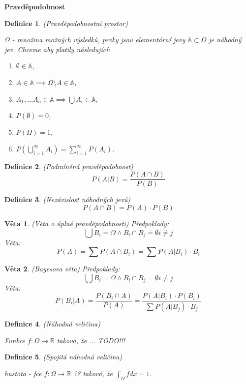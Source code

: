 \documentclass[a4paper,10pt,titlepage]{article} \usepackage[utf8]{inputenc}
\newtheorem{theorem}{Věta}
\newtheorem{define}{Definice}
\begin{document}
 \pagestyle{empty}
\begin{center}
\textbf{Pravděpodobnost}
\end{center}

\begin{define}
(Pravděpodobnostní prostor)

$\Omega$ - množina možných výsledků, prvky jsou elementární jevy
$\mathbb{A} \subset \Omega$ je náhodný jev.
Chceme aby platily následující:
\begin{enumerate}
\item $\emptyset \in \mathbb{A}$,
\item $A \in \mathbb{A} \implies \Omega \setminus A \in \mathbb{A}$,
\item $A_1, \ldots A_n \in \mathbb{A} \implies \bigcup A_i \in \mathbb{A}$,
\item $P(\emptyset) = 0$,
\item $P(\Omega) = 1$,
\item $P\left(\bigcup_{i=1}^{\infty} A_i\right) = \sum_{i=1}^{\infty} P(A_i)$.
\end{enumerate}
\end{define}

\begin{define}
(Podmíněná pravděpodobnost)
\[
	P(A|B) = \frac{P(A \cap B)}{P(B)}
\]
\end{define}

\begin{define}
(Nezávislost náhodných jevů)
\[
P(A \cap B) = P(A) \cdot P(B)
\]
\end{define}

\begin{theorem}
(Věta o úplné pravděpodobnosti)
Předpoklady:
\[
	\bigcup B_i = \Omega \wedge B_i \cap B_j =\emptyset i\neq j
\]
Věta:
\[
P(A) = \sum P(A \cap B_i) = \sum P(A|B_i) \cdot B_i
\]
\end{theorem}

\begin{theorem}
(Bayesova věta)
Předpoklady:
\[
	\bigcup B_i = \Omega \wedge B_i \cap B_j =\emptyset i\neq j
\]
Věta:
\[
P(B_i|A) =\frac{P(B_i \cap A)}{P(A)} = \frac{P(A|B_i)\cdot P(B_i)}{\sum P(A|B_j) \cdot B_j}
\]
\end{theorem}

\begin{define}
(Náhodná veličina)

Funkce $f: \Omega \rightarrow \mathbb{R}$ taková, že ... TODO!!!
\end{define}

\begin{define}
(Spojitá náhodná veličina)

hustota - fce $f: \Omega \rightarrow \mathbb{R}$ ?? taková, že $\int_{\Omega} f dx = 1$.
\end{define}
\end{document}
